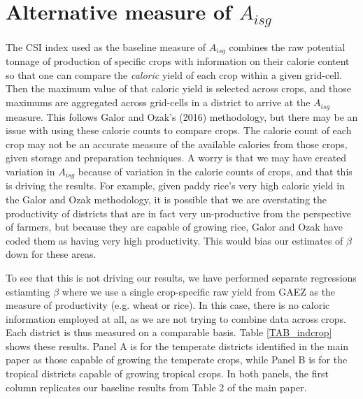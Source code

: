 \documentclass[11pt]{article}
\begin{document}
\section{Alternative measure of $A_{isg}$}
The CSI index used as the baseline measure of $A_{isg}$ combines the raw potential tonnage of production of specific crops with information on their calorie content so that one can compare the \textit{caloric} yield of each crop within a given grid-cell. Then the maximum value of that caloric yield is selected across crops, and those maximums are aggregated across grid-cells in a district to arrive at the $A_{isg}$ measure. This follows Galor and Ozak's (2016) methodology, but there may be an issue with using these calorie counts to compare crops. The calorie count of each crop may not be an accurate measure of the available calories from those crops, given storage and preparation techniques. A worry is that we may have created variation in $A_{isg}$ because of variation in the calorie counts of crops, and that this is driving the results. For example, given paddy rice's very high caloric yield in the Galor and Ozak methodology, it is possible that we are overstating the productivity of districts that are in fact very un-productive from the perspective of farmers, but because they are capable of growing rice, Galor and Ozak have coded them as having very high productivity. This would bias our estimates of $\beta$ down for these areas. 

To see that this is not driving our results, we have performed separate regressions estiamting $\beta$ where we use a single crop-specific raw yield from GAEZ as the measure of productivity (e.g. wheat or rice). In this case, there is no caloric information employed at all, as we are not trying to combine data across crops. Each district is thus measured on a comparable basis. Table \ref{TAB_indcrop} shows these results. Panel A is for the temperate districts identified in the main paper as those capable of growing the temperate crops, while Panel B is for the tropical districts capable of growing tropical crops. In both panels, the first column replicates our baseline results from Table 2 of the main paper.
\end{document}
